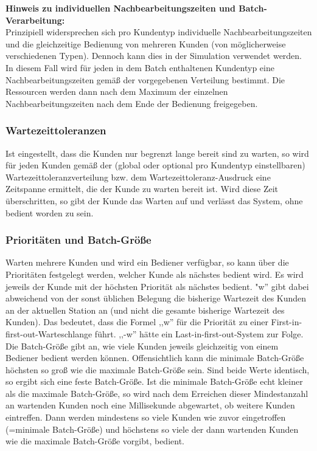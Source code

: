 \textbf{Hinweis zu individuellen Nachbearbeitungszeiten und Batch-Verarbeitung:}~\\
Prinzipiell widersprechen sich pro Kundentyp individuelle Nachbearbeitungszeiten und die gleichzeitige Bedienung von mehreren Kunden
(von möglicherweise verschiedenen Typen). Dennoch kann dies in der Simulation verwendet werden. In diesem Fall wird für jeden
in dem Batch enthaltenen Kundentyp eine Nachbearbeitungszeiten gemäß der vorgegebenen Verteilung bestimmt. Die Ressourcen werden
dann nach dem Maximum der einzelnen Nachbearbeitungszeiten nach dem Ende der Bedienung freigegeben.

\subsubsection*{Wartezeittoleranzen}

Ist eingestellt, dass die Kunden nur begrenzt lange bereit sind zu warten, so wird für jeden Kunden gemäß der (global oder optional
pro Kundentyp einstellbaren) Wartezeittoleranzverteilung bzw. dem Wartezeittoleranz-Ausdruck eine Zeitspanne ermittelt, die der
Kunde zu warten bereit ist. Wird diese Zeit überschritten, so gibt der Kunde das Warten auf und verlässt das System,
ohne bedient worden zu sein.

\subsubsection*{Prioritäten und Batch-Größe}

Warten mehrere Kunden und wird ein Bediener verfügbar, so kann über die Prioritäten festgelegt werden, welcher Kunde als nächstes
bedient wird. Es wird jeweils der Kunde mit der höchsten Priorität als nächstes bedient.
"w'' gibt dabei abweichend von der sonst üblichen Belegung die bisherige Wartezeit des Kunden an der aktuellen Station an (und nicht
die gesamte bisherige Wartezeit des Kunden). Das bedeutet, dass die Formel ,,w'' für die Priorität zu einer
First-in-first-out-Warteschlange führt. ,,-w'' hätte ein Last-in-first-out-System zur Folge.
Die Batch-Größe gibt an, wie viele Kunden jeweils gleichzeitig von einem Bediener bedient werden können. Offensichtlich kann die
minimale Batch-Größe höchsten so groß wie die maximale Batch-Größe sein. Sind beide Werte identisch, so ergibt sich eine feste
Batch-Größe. Ist die minimale Batch-Größe echt kleiner als die maximale Batch-Größe, so wird nach dem Erreichen dieser Mindestanzahl
an wartenden Kunden noch eine Millisekunde abgewartet, ob weitere Kunden eintreffen. Dann werden mindestens so viele Kunden wie zuvor
eingetroffen (=minimale Batch-Größe) und höchstens so viele der dann wartenden Kunden wie die maximale Batch-Größe vorgibt, bedient. 

